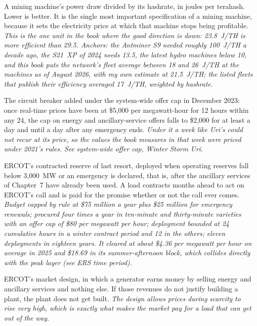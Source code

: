 \begin{description}[leftmargin=0pt,style=unboxed,itemsep=0.35em,parsep=0.15em]
\item[efficiency (J/TH)] \hypertarget{glossary:efficiency}{}A mining machine's power draw divided by its hashrate, in joules per terahash. Lower is better. It is the single most important specification of a mining machine, because it sets the electricity price at which that machine stops being profitable. \emph{This is the one unit in the book where the good direction is down: 23.8~J/TH is more efficient than 29.5. Anchors: the Antminer S9 needed roughly 100~J/TH a decade ago, the S21~XP of 2024 needs 13.5, the latest hydro machines below 10, and this book puts the network's fleet average between 18 and 26~J/TH at the machines as of August 2026, with my own estimate at 21.5~J/TH; the listed fleets that publish their efficiency averaged 17~J/TH, weighted by hashrate.}
\item[Emergency Pricing Program (EPP)] \hypertarget{glossary:emergency-pricing-program}{}The circuit breaker added under the system-wide offer cap in December 2023: once real-time prices have been at \$5,000 per megawatt-hour for 12 hours within any 24, the cap on energy and ancillary-service offers falls to \$2,000 for at least a day and until a day after any emergency ends. \emph{Under it a week like Uri's could not recur at its price, so the values the book measures in that week were priced under 2021's rules. See system-wide offer cap, Winter Storm Uri.}
\item[Emergency Response Service (ERS)] \hypertarget{glossary:emergency-response-service}{}ERCOT's contracted reserve of last resort, deployed when operating reserves fall below 3,000~MW or an emergency is declared, that is, after the ancillary services of Chapter~7 have already been used. A load contracts months ahead to act on ERCOT's call and is paid for the promise whether or not the call ever comes. \emph{Budget capped by rule at \$75 million a year plus \$25 million for emergency renewals; procured four times a year in ten-minute and thirty-minute varieties with an offer cap of \$80 per megawatt per hour; deployment bounded at 24 cumulative hours in a winter contract period and 12 in the others; eleven deployments in eighteen years. It cleared at about \$4.36 per megawatt per hour on average in 2025 and \$18.69 in its summer-afternoon block, which collides directly with the peak layer (see ERS time period).}
\item[energy-only market] \hypertarget{glossary:energy-only-market}{}ERCOT's market design, in which a generator earns money by selling energy and ancillary services and nothing else. If those revenues do not justify building a plant, the plant does not get built. \emph{The design allows prices during scarcity to rise very high, which is exactly what makes the market pay for a load that can get out of the way.}

\end{description}
